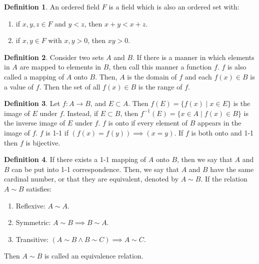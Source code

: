 \documentclass[12pt]{article}
\theoremstyle{definition}
\newtheorem{definition}{Definition}
\theoremstyle{named}
\begin{document}
\renewcommand{\thedefinition}{6.1}
\begin{definition}
    An ordered field $F$ is a field which is also an ordered set with: 
    \begin{enumerate}
        \item if $x,y,z \in F$ and $y<z$, then $x+y < x+z$.
        \item if $x,y \in F$ with $x,y>0$, then $xy>0$. 
    \end{enumerate}
\end{definition}

\renewcommand{\thedefinition}{6.1}
\begin{definition}
    Consider two sets $A$ and $B$. If there is a manner in which elements in $A$ are mapped to elements in $B$, then call this manner a function $f$. $f$ is also called a mapping of $A$ onto $B$. Then, $A$ is the domain of $f$ and each $f(x) \in B$ is a value of $f$. Then the set of all $f(x) \in B$ is the range of $f$. 
\end{definition}

\renewcommand{\thedefinition}{6.1}
\begin{definition}
    Let $f: A \to B$, and $E \subset A$. Then $f(E) = \{f(x) \mid x \in E\}$ is the image of $E$ under $f$. Instead, if $E \subset B$, then $f^{-1}(E) = \{x \in A \mid f(x) \in B\}$ is the inverse image of $E$ under $f$. $f$ is onto if every element of $B$ appears in the image of $f$. $f$ is 1-1 if $(f(x)=f(y)) \implies (x=y)$. If $f$ is both onto and 1-1 then $f$ is bijective. 
\end{definition}

\renewcommand{\thedefinition}{6.1}
\begin{definition}
    If there exists a 1-1 mapping of $A$ onto $B$, then we say that $A$ and $B$ can be put into 1-1 correspondence. Then, we say that $A$ and $B$ have the same cardinal number, or that they are equivalent, denoted by $A \sim B$. If the relation $A \sim B$ satisfies: 
    \begin{enumerate}
        \item Reflexive: $A \sim A$.
        \item Symmetric: $A \sim B \implies B \sim A$. 
        \item Transitive: $(A \sim B \land B \sim C) \implies A \sim C$. 
    \end{enumerate}
    Then $A \sim B$ is called an equivalence relation.
\end{definition}
\end{document}

